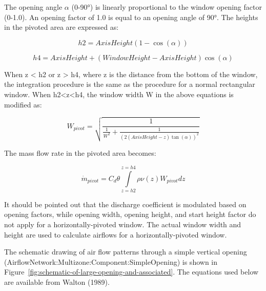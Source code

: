 The opening angle \(\alpha\) (0-90°) is linearly proportional to the window opening factor (0-1.0). An opening factor of 1.0 is equal to an opening angle of 90°. The heights in the pivoted area are expressed as:

\begin{equation}
h2 = AxisHeight(1 - \cos (\alpha ))
\end{equation}

\begin{equation}
h4 = AxisHeight + (WindowHeight - AxisHeight)\cos (\alpha )
\end{equation}

When z \textless{} h2 or z \textgreater{} h4, where z is the distance from the bottom of the window, the integration procedure is the same as the procedure for a normal rectangular window. When h2\textless{}z\textless{}h4, the window width W in the above equations is modified as:

\begin{equation}
W_{pivot} = \sqrt{\frac{1}{{\frac{1}{{{W^2}}} + \frac{1}{{{{(2(AxisHeight - z)\tan (\alpha ))}^2}}}}}}
\end{equation}

The mass flow rate in the pivoted area becomes:

\begin{equation}
{\dot m_{pivot}} = {C_d}\theta \int\limits_{z = h2}^{z = h4} {\rho \nu (z){W_{pivot}}dz}
\end{equation}

It should be pointed out that the discharge coefficient is modulated based on opening factors, while opening width, opening height, and start height factor do not apply for a horizontally-pivoted window. The actual window width and height are used to calculate airflows for a horizontally-pivoted window.

The schematic drawing of air flow patterns through a simple vertical opening (AirflowNetwork:Multizone:Component:SimpleOpening) is shown in Figure~\ref{fig:schematic-of-large-opening-and-associated}. The equations used below are available from Walton (1989).

